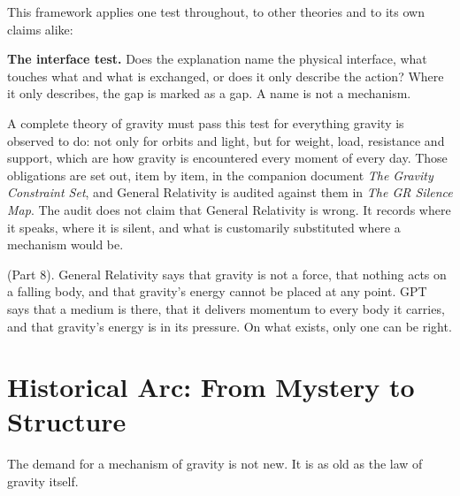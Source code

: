 \documentclass[11pt,a4paper]{article}
\begin{document}
This framework applies one test throughout, to other theories and to its own claims alike:

\begin{tcolorbox}[colback=black!3,colframe=black!25,boxrule=0.4pt,arc=2pt,left=8pt,right=8pt,top=6pt,bottom=6pt]
\textbf{The interface test.} Does the explanation name the physical interface, what touches what and what is exchanged, or does it only describe the action? Where it only describes, the gap is marked as a gap. A name is not a mechanism.
\end{tcolorbox}

A complete theory of gravity must pass this test for everything gravity is observed to do: not only for orbits and light, but for weight, load, resistance and support, which are how gravity is encountered every moment of every day. Those obligations are set out, item by item, in the companion document \emph{The Gravity Constraint Set}, and General Relativity is audited against them in \emph{The GR Silence Map}. The audit does not claim that General Relativity is wrong. It records where it speaks, where it is silent, and what is customarily substituted where a mechanism would be.

 (Part 8). General Relativity says that gravity is not a force, that nothing acts on a falling body, and that gravity's energy cannot be placed at any point. GPT says that a medium is there, that it delivers momentum to every body it carries, and that gravity's energy is in its pressure. On what exists, only one can be right.

\section{Historical Arc: From Mystery to Structure}

The demand for a mechanism of gravity is not new. It is as old as the law of gravity itself.
\end{document}
